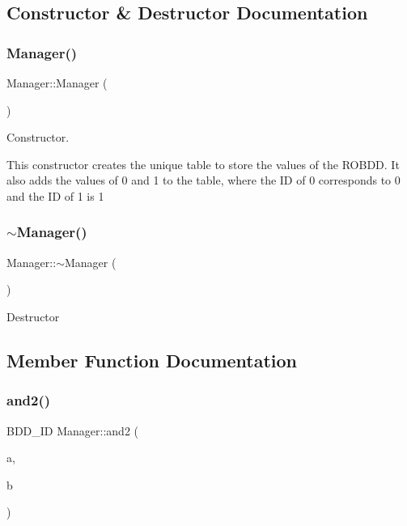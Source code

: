 \subsection{Constructor \& Destructor Documentation}
\mbox{\label{classManager_a1658ff9f18e38ccd9cb8b0b371b9c20b}} 
\subsubsection{\texorpdfstring{Manager()}{Manager()}}
{\footnotesize\ttfamily Manager\+::\+Manager (\begin{DoxyParamCaption}{ }\end{DoxyParamCaption})}



Constructor. 

This constructor creates the unique table to store the values of the R\+O\+B\+DD. It also adds the values of \textquotesingle{}0\textquotesingle{} and \textquotesingle{}1\textquotesingle{} to the table, where the ID of \textquotesingle{}0\textquotesingle{} corresponds to 0 and the ID of \textquotesingle{}1\textquotesingle{} is 1 \mbox{\label{classManager_a322cad25d7007438b3a043ad02253d29}} 
\subsubsection{\texorpdfstring{$\sim$\+Manager()}{~Manager()}}
{\footnotesize\ttfamily Manager\+::$\sim$\+Manager (\begin{DoxyParamCaption}{ }\end{DoxyParamCaption})}

Destructor 

\subsection{Member Function Documentation}
\mbox{\label{classManager_a029fff4ef6650e4fd1f0ff37a69252de}} 
\subsubsection{\texorpdfstring{and2()}{and2()}}
{\footnotesize\ttfamily B\+D\+D\+\_\+\+ID Manager\+::and2 (\begin{DoxyParamCaption}\item[{const B\+D\+D\+\_\+\+ID}]{a,  }\item[{const B\+D\+D\+\_\+\+ID}]{b }\end{DoxyParamCaption})\hspace{0.3cm}{\ttfamily [virtual]}}

